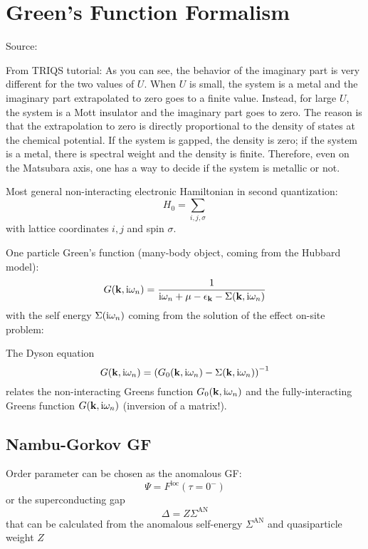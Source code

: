 \chapter{Green's Function Formalism}\label{ch:green's-function-formalism}

Source: \cite{Bruus_Flensberg_2004}

From TRIQS tutorial:
As you can see, the behavior of the imaginary part is very different for the two values of $U$. When
$U$ is small, the system is a metal and the imaginary part extrapolated to zero goes to a finite value.
Instead, for large $U$, the system is a Mott insulator and the imaginary part goes to zero. The reason
is that the extrapolation to zero is directly proportional to the density of states at the chemical
potential. If the system is gapped, the density is zero; if the system is a metal, there is spectral
weight and the density is finite. Therefore, even on the Matsubara axis, one has a way to decide if the
system is metallic or not.


Most general non-interacting electronic Hamiltonian in second quantization:
\begin{equation}
    H_0 = \sum_{i, j, \sigma}
\end{equation}
with lattice coordinates \(i, j\) and spin \(\sigma\).


One particle Green's function (many-body object, coming from the Hubbard model):
\begin{equation}
    G(\bm{\mathrm{k}}, \mathrm{i} \omega_n) = \frac{1}{\mathrm{i} \omega_n + \mu - \epsilon_{\bm{\mathrm{k}}} - \Sigma(\bm{\mathrm{k}}, \mathrm{i} \omega_n)}
\end{equation}
with the self energy \(\Sigma(\mathrm{i} \omega_n)\) coming from the solution of the effect on-site problem:

The Dyson equation
\begin{equation}
    G(\bm{\mathrm{k}}, \mathrm{i} \omega_n) = \left( G_0 (\bm{\mathrm{k}}, \mathrm{i} \omega_n) - \Sigma(\bm{\mathrm{k}}, \mathrm{i} \omega_n)\right)^{-1}
\end{equation}
relates the non-interacting Greens function \(G_0 (\bm{\mathrm{k}}, \mathrm{i} \omega_n)\) and the fully-interacting Greens function \(G (\bm{\mathrm{k}}, \mathrm{i} \omega_n)\) (inversion of a matrix!).

\section{Nambu-Gorkov GF}

Order parameter can be chosen as the anomalous GF:
\begin{equation}
    \Psi = F^{\mathrm{loc}} (\tau = 0^-)
\end{equation}
or the superconducting gap
\begin{equation}
    \Delta = Z \Sigma^{\mathrm{AN}}
\end{equation}
that can be calculated from the anomalous self-energy \(\Sigma^{\mathrm{AN}}\) and quasiparticle weight \(Z\)


